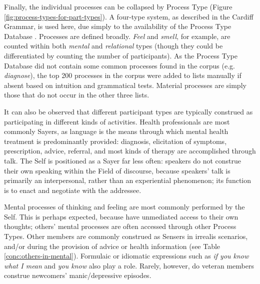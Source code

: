 Finally, the individual processes can be collapsed by Process Type (Figure \ref{fig:process-types-for-part-types}). A four-type system, as described in the Cardiff Grammar, is used here, due simply to the availability of the Process Type Database \cite{neale_more_2002}. Processes are defined broadly. \emph{Feel} and \emph{smell}, for example, are counted within both \emph{mental} and \emph{relational} types (though they could be differentiated by counting the number of participants). As the Process Type Database did not contain some common processes found in the \gls{corpus} (e.g. \emph{diagnose}), the top 200 processes in the \gls{corpus} were added to lists manually if absent based on intuition and grammatical tests. Material processes are simply those that do not occur in the other three lists.

It can also be observed that different participant types are typically construed as participating in different kinds of activities. Health professionals are most commonly Sayers, as language is the means through which mental health treatment is predominantly provided: diagnosis, elicitation of symptoms, prescription, advice, referral, and most kinds of therapy are accomplished through talk. The Self is positioned as a Sayer far less often: speakers do not construe their own speaking within the Field of discourse, because speakers' talk is primarily an interpersonal, rather than an experiential phenomenon; its function is to enact and negotiate with the addressee.

Mental processes of thinking and feeling are most commonly performed by the Self. This is perhaps expected, because  have unmediated access to their own thoughts; others' mental processes are often accessed through other Process Types. Other members are commonly construed as Sensers in irrealis scenarios, and\slash or during the provision of advice or health information (see Table \ref{conc:others-in-mental}). Formulaic or idiomatic expressions such as \emph{if you know what I mean} and \emph{you know} also play a role. Rarely, however, do veteran \glspl{member} construe newcomers' manic\slash depressive episodes.

